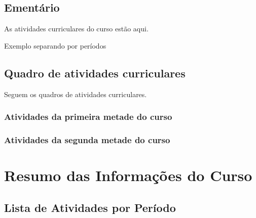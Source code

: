 \documentclass[a4]{ppc-ufscar}
\begin{document}
\ptbrsentenca[700-703]


\section{Ementário}
As atividades curriculares do curso estão aqui. \ptbrparagrafo[11-12]


Exemplo separando por períodos


\section{Quadro de atividades curriculares}
Seguem os quadros de atividades curriculares. \ptbrsentenca[66]

\begin{landscape}
    \subsection{Atividades da primeira metade do curso}


    \subsection{Atividades da segunda metade do curso}

\end{landscape}


\appendix


\chapter{Resumo das Informações do Curso}


\section{Lista de Atividades por Período}
\end{document}
